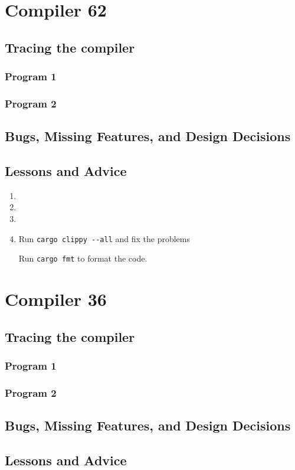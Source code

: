 
	\chapter*{Compiler 62}

	\section{Tracing the compiler}

	\subsection{Program 1}

	\subsection{Program 2}

	\section{Bugs, Missing Features, and Design Decisions}

	\section{Lessons and Advice}

	\begin{enumerate}
		\item 
		\item
		\item
		\item Run \verb|cargo clippy --all| and fix the problems

			Run \verb|cargo fmt| to format the code.
	\end{enumerate}

	\chapter*{Compiler 36}

	\section{Tracing the compiler}

	\subsection{Program 1}

	\subsection{Program 2}

	\section{Bugs, Missing Features, and Design Decisions}

	\section{Lessons and Advice}


